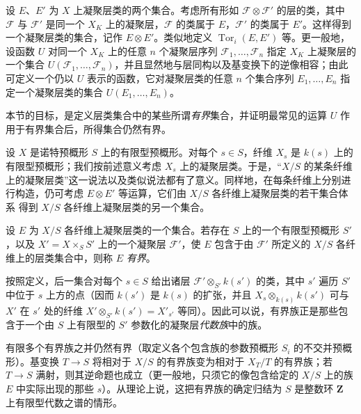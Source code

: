 设 $E$、$E'$ 为 $X$ 上凝聚层类的两个集合。考虑所有形如
$\mathcal F\otimes\mathcal F'$ 的层的类，其中 $\mathcal F$ 与
$\mathcal F'$ 是同一个 $X_K$ 上的凝聚层，$\mathcal F$ 的类属于
$E$，$\mathcal F'$ 的类属于 $E'$。这样得到一个凝聚层类的集合，记作
$E\otimes E'$。类似地定义
$\operatorname{Tor}_i(E,E')$ 等。更一般地，设函数 $U$ 对同一个
$X_K$ 上的任意 $n$ 个凝聚层序列
$\mathcal F_1,\ldots,\mathcal F_n$ 指定 $X_K$ 上凝聚层的一个集合
$U(\mathcal F_1,\ldots,\mathcal F_n)$，并且显然地与层同构以及基变换下的逆像相容；由此可定义一个仍以 $U$ 表示的函数，它对凝聚层类的任意 $n$ 个集合序列
$E_1,\ldots,E_n$ 指定一个凝聚层类的集合
$U(E_1,\ldots,E_n)$。

本节的目标，是定义层类集合中的某些所谓\emph{有界}集合，并证明最常见的运算 $U$ 作用于有界集合后，所得集合仍然有界。

设 $X$ 是诺特预概形 $S$ 上的有限型预概形。对每个 $s\in S$，纤维
$X_s$ 是 $k(s)$ 上的有限型预概形；我们按前述意义考虑 $X_s$ 上的凝聚层类。于是，“$X/S$ 的某条纤维上的凝聚层类”这一说法以及类似说法都有了意义。同样地，在每条纤维上分别进行构造，仍可考虑
$E\otimes E'$ 等运算，它们由 $X/S$ 各纤维上凝聚层类的若干集合体系
得到 $X/S$ 各纤维上凝聚层类的另一个集合。

 设 $E$ 为 $X/S$ 各纤维上凝聚层类的一个集合。若存在 $S$ 上的一个有限型预概形 $S'$，以及
$X'=X\times_S S'$ 上的一个凝聚层 $\mathcal F'$，使 $E$ 包含于由
$\mathcal F'$ 所定义的 $X/S$ 各纤维上的层类集合中，则称 $E$ \emph{有界}。

按照定义，后一集合对每个 $s\in S$ 给出诸层
$\mathcal F'\otimes_{S'}k(s')$ 的类，其中 $s'$ 遍历 $S'$ 中位于
$s$ 上方的点（因而 $k(s')$ 是 $k(s)$ 的扩张，并且
$X_s\otimes_{k(s)}k(s')$ 可与 $X'$ 在 $s'$ 处的纤维
$X'\otimes_{S'}k(s')=X'_{s'}$ 等同）。因此可以说，有界族正是那些包含于一个由 $S$ 上有限型的 $S'$ 参数化的凝聚层\emph{代数族}中的族。

有限多个有界族之并仍然有界（取定义各个包含族的参数预概形
$S_i$ 的不交并预概形）。基变换 $T\longrightarrow S$ 将相对于
$X/S$ 的有界族变为相对于 $X_T/T$ 的有界族；若
$T\longrightarrow S$ 满射，则其逆命题也成立（更一般地，只须它的像包含给定的 $X/S$ 上的族 $E$ 中实际出现的那些 $s$）。从理论上说，这把有界族的确定归结为 $S$ 是整数环 $\mathbf Z$ 上有限型代数之谱的情形。

